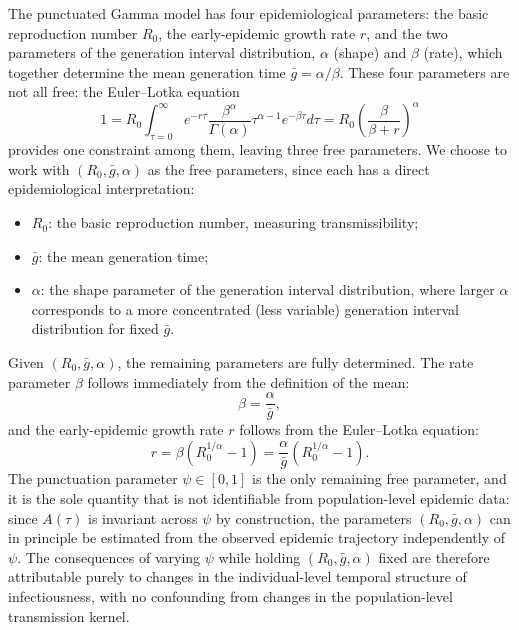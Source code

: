 The punctuated Gamma model has four epidemiological parameters: the basic  reproduction number $R_0$, the early-epidemic growth rate $r$, and the two  parameters of the generation interval distribution, $\alpha$ (shape) and  $\beta$ (rate), which together determine the mean generation time  $\bar{g} = \alpha/\beta$. These four parameters are not all free: the  Euler--Lotka equation
%
\begin{equation}
	1  
	=R_0 \int_{\tau=0}^\infty e^{-r\tau } \frac{\beta^\alpha}{\Gamma(\alpha)} \tau^{\alpha-1} e^{-\beta \tau} d\tau
	= R_0 \left(\frac{\beta}{\beta + r}\right)^\alpha
	\label{eq:euler_lotka}
\end{equation}
%
provides one constraint among them, leaving three free parameters. We  choose to work with $(R_0, \bar{g}, \alpha)$ as the free parameters,  since each has a direct epidemiological interpretation:
%
\begin{itemize}
    \item $R_0$: the basic reproduction number, measuring transmissibility;
    \item $\bar{g}$: the mean generation time;
    \item $\alpha$: the shape parameter of the generation interval  distribution, where larger $\alpha$ corresponds to a more concentrated  (less variable) generation interval distribution for fixed $\bar{g}$.
\end{itemize}
%
Given $(R_0, \bar{g}, \alpha)$, the remaining parameters are fully  determined. The rate parameter $\beta$ follows immediately from the  definition of the mean:
%
\begin{equation}
    \beta = \frac{\alpha}{\bar{g}},
\end{equation}
%
and the early-epidemic growth rate $r$ follows from the Euler--Lotka equation:
%
\begin{equation}
    r = \beta\left(R_0^{1/\alpha} - 1\right) 
      = \frac{\alpha}{\bar{g}}\left(R_0^{1/\alpha} - 1\right).
    \label{eq:r_from_params}
\end{equation}
%
The punctuation  parameter $\psi \in [0, 1]$ is the only remaining free parameter, and  it is the sole quantity that is not identifiable from population-level  epidemic data: since $A(\tau)$ is invariant across $\psi$ by  construction, the parameters $(R_0, \bar{g}, \alpha)$ can in principle  be estimated from the observed epidemic trajectory independently of  $\psi$. The consequences of varying $\psi$ while holding  $(R_0, \bar{g}, \alpha)$ fixed are therefore attributable purely to  changes in the individual-level temporal structure of infectiousness, with no confounding from changes in the population-level transmission  kernel.

